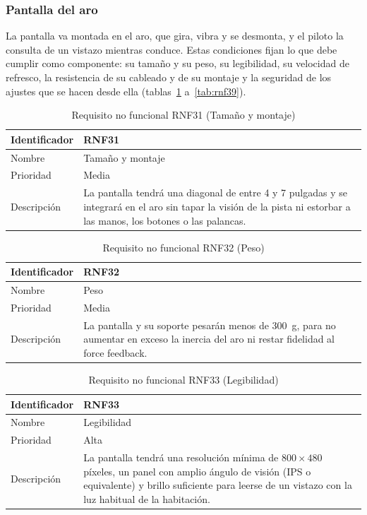\subsubsection{Pantalla del aro}

La pantalla va montada en el aro, que gira, vibra y se desmonta, y el piloto la consulta de un vistazo mientras conduce. Estas condiciones fijan lo que debe cumplir como componente: su tamaño y su peso, su legibilidad, su velocidad de refresco, la resistencia de su cableado y de su montaje y la seguridad de los ajustes que se hacen desde ella (tablas~\ref{tab:rnf31} a~\ref{tab:rnf39}).

\begin{table}[H]
	\centering
	\renewcommand{\arraystretch}{2}
	\begin{tabular}{|l|p{10cm}|}
		\hline
		Identificador & RNF31 \\
		\hline
		Nombre & Tamaño y montaje \\
		\hline
		Prioridad & Media \\
		\hline
		Descripción & La pantalla tendrá una diagonal de entre 4 y 7 pulgadas y se integrará en el aro sin tapar la visión de la pista ni estorbar a las manos, los botones o las palancas. \\
		\hline
	\end{tabular}
	\caption{Requisito no funcional RNF31 (Tamaño y montaje)}
	\label{tab:rnf31}
\end{table}

\begin{table}[H]
	\centering
	\renewcommand{\arraystretch}{2}
	\begin{tabular}{|l|p{10cm}|}
		\hline
		Identificador & RNF32 \\
		\hline
		Nombre & Peso \\
		\hline
		Prioridad & Media \\
		\hline
		Descripción & La pantalla y su soporte pesarán menos de 300~g, para no aumentar en exceso la inercia del aro ni restar fidelidad al force feedback. \\
		\hline
	\end{tabular}
	\caption{Requisito no funcional RNF32 (Peso)}
	\label{tab:rnf32}
\end{table}

\begin{table}[H]
	\centering
	\renewcommand{\arraystretch}{2}
	\begin{tabular}{|l|p{10cm}|}
		\hline
		Identificador & RNF33 \\
		\hline
		Nombre & Legibilidad \\
		\hline
		Prioridad & Alta \\
		\hline
		Descripción & La pantalla tendrá una resolución mínima de $800\times480$ píxeles, un panel con amplio ángulo de visión (IPS o equivalente) y brillo suficiente para leerse de un vistazo con la luz habitual de la habitación. \\
		\hline
	\end{tabular}
	\caption{Requisito no funcional RNF33 (Legibilidad)}
	\label{tab:rnf33}
\end{table}

